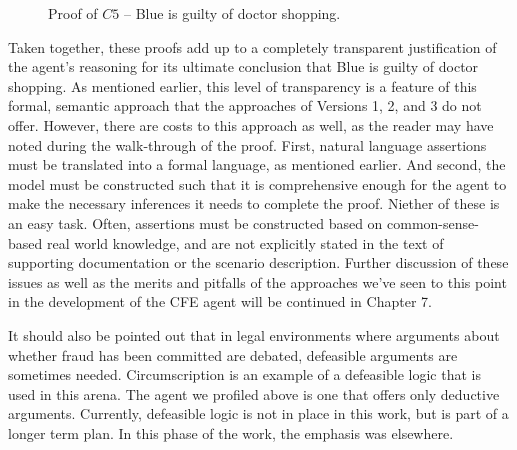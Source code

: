 \begin{figure}[h!] 
\vspace{6pt}
\centering
{}
\caption{Proof of $C5$ -- Blue is guilty of doctor shopping.}
\label{fig:proof_of_c5}
\end{figure}

Taken together, these proofs add up to a completely transparent justification of the agent's reasoning for its ultimate conclusion that Blue is guilty of doctor shopping.  As mentioned earlier, this level of transparency is a feature of this formal, semantic approach that the approaches of Versions 1, 2, and 3 do not offer.  However, there are costs to this approach as well, as the reader may have noted during the walk-through of the proof.  First, natural language assertions must be translated into a formal language, as mentioned earlier.  And second, the model must be constructed such that it is comprehensive enough for the agent to make the necessary inferences it needs to complete the proof.  Niether of these is an easy task.  Often, assertions must be constructed based on common-sense-based real world knowledge, and are not explicitly stated in the text of supporting documentation or the scenario description.  Further discussion of these issues as well as the merits and pitfalls of the approaches we've seen to this point in the development of the CFE agent will be continued in Chapter 7.

It should also be pointed out that in legal environments where arguments about whether fraud has been committed are debated, defeasible arguments \cite{nute2001defeasible} are sometimes needed.   Circumscription \cite{dimopoulos2002computational} is an example of a defeasible logic that is used in this arena.  The agent we profiled above is one that offers only deductive arguments.  Currently, defeasible logic is not in place in this work, but is part of a longer term plan. In this phase of the work, the emphasis was elsewhere.

